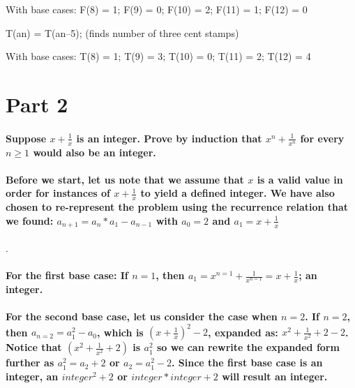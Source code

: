 \documentclass{article}
\newcounter{prob}\setcounter{prob}{1}\newcommand{\prob}{\arabic{prob}.\indent \addtocounter{prob}{1}}
\begin{document}
With base cases: F(8) = 1; F(9) = 0; F(10) = 2; F(11) = 1; F(12) = 0

\noindent T(an) = T(an–5);       (finds number of three cent stamps)

With base cases: T(8) = 1; T(9) = 3; T(10) = 0; T(11) = 2; T(12) = 4
\newpage
\section{Part 2}
\paragraph{Suppose $x+\frac{1}{x}$ is an integer. Prove by induction that $x^n + \frac{1}{x^n}$ for every $n\geq1$ would also be an integer. }
\paragraph{Before we start, let us note that we assume that $x$ is a valid value in order for instances of $x + \frac{1}{x}$ to yield a defined integer. We have also chosen to re-represent the problem using the recurrence relation that we found: $a_{n+1} = a_{n}*a_{1}-a_{n-1}$  with $a_{0}=2$ and $a_{1}=x+\frac{1}{x}$}. 
\paragraph{For the first base case: If $n=1$, then $a_{1}=x^{n=1} + \frac{1}{x^{n=1}} = x + \frac{1}{x}$; an integer. }
\paragraph{For the second base case, let us consider the case when $n = 2$. If $n = 2$, then $a_{n=2}=a_{1}^2-a_{0}$, which is $(x+\frac{1}{x})^2-2$, expanded as: $x^2 + \frac{1}{x^2}+2-2$. Notice that $(x^2 + \frac{1}{x^2} +2)$ is $a_{1}^2$ so we can rewrite the expanded form further as $a_{1}^2 = a_{2} + 2$ or $a_{2} = a_{1}^2 - 2$. Since the first base case is an integer, an $integer^2 + 2$ or $integer * integer + 2$ will result an integer. }
\end{document}
